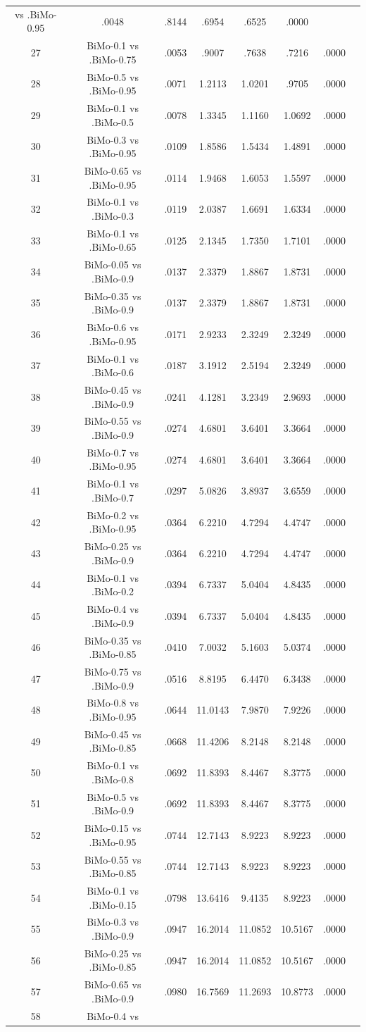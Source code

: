 \documentclass[a4paper,10pt]{article}
\begin{document}
\begin{landscape}
\begin{table}[!htp]
\begin{tabular}{cccccccc}
vs .BiMo-0.95&.0048&.8144&.6954&.6525&.0000\\27&BiMo-0.1 vs .BiMo-0.75&.0053&.9007&.7638&.7216&.0000\\28&BiMo-0.5 vs .BiMo-0.95&.0071&1.2113&1.0201&.9705&.0000\\29&BiMo-0.1 vs .BiMo-0.5&.0078&1.3345&1.1160&1.0692&.0000\\30&BiMo-0.3 vs .BiMo-0.95&.0109&1.8586&1.5434&1.4891&.0000\\31&BiMo-0.65 vs .BiMo-0.95&.0114&1.9468&1.6053&1.5597&.0000\\32&BiMo-0.1 vs .BiMo-0.3&.0119&2.0387&1.6691&1.6334&.0000\\33&BiMo-0.1 vs .BiMo-0.65&.0125&2.1345&1.7350&1.7101&.0000\\34&BiMo-0.05 vs .BiMo-0.9&.0137&2.3379&1.8867&1.8731&.0000\\35&BiMo-0.35 vs .BiMo-0.9&.0137&2.3379&1.8867&1.8731&.0000\\36&BiMo-0.6 vs .BiMo-0.95&.0171&2.9233&2.3249&2.3249&.0000\\37&BiMo-0.1 vs .BiMo-0.6&.0187&3.1912&2.5194&2.3249&.0000\\38&BiMo-0.45 vs .BiMo-0.9&.0241&4.1281&3.2349&2.9693&.0000\\39&BiMo-0.55 vs .BiMo-0.9&.0274&4.6801&3.6401&3.3664&.0000\\40&BiMo-0.7 vs .BiMo-0.95&.0274&4.6801&3.6401&3.3664&.0000\\41&BiMo-0.1 vs .BiMo-0.7&.0297&5.0826&3.8937&3.6559&.0000\\42&BiMo-0.2 vs .BiMo-0.95&.0364&6.2210&4.7294&4.4747&.0000\\43&BiMo-0.25 vs .BiMo-0.9&.0364&6.2210&4.7294&4.4747&.0000\\44&BiMo-0.1 vs .BiMo-0.2&.0394&6.7337&5.0404&4.8435&.0000\\45&BiMo-0.4 vs .BiMo-0.9&.0394&6.7337&5.0404&4.8435&.0000\\46&BiMo-0.35 vs .BiMo-0.85&.0410&7.0032&5.1603&5.0374&.0000\\47&BiMo-0.75 vs .BiMo-0.9&.0516&8.8195&6.4470&6.3438&.0000\\48&BiMo-0.8 vs .BiMo-0.95&.0644&11.0143&7.9870&7.9226&.0000\\49&BiMo-0.45 vs .BiMo-0.85&.0668&11.4206&8.2148&8.2148&.0000\\50&BiMo-0.1 vs .BiMo-0.8&.0692&11.8393&8.4467&8.3775&.0000\\51&BiMo-0.5 vs .BiMo-0.9&.0692&11.8393&8.4467&8.3775&.0000\\52&BiMo-0.15 vs .BiMo-0.95&.0744&12.7143&8.9223&8.9223&.0000\\53&BiMo-0.55 vs .BiMo-0.85&.0744&12.7143&8.9223&8.9223&.0000\\54&BiMo-0.1 vs .BiMo-0.15&.0798&13.6416&9.4135&8.9223&.0000\\55&BiMo-0.3 vs .BiMo-0.9&.0947&16.2014&11.0852&10.5167&.0000\\56&BiMo-0.25 vs .BiMo-0.85&.0947&16.2014&11.0852&10.5167&.0000\\57&BiMo-0.65 vs .BiMo-0.9&.0980&16.7569&11.2693&10.8773&.0000\\58&BiMo-0.4 vs 
\end{tabular}
\end{table}
\end{landscape}
\end{document}

